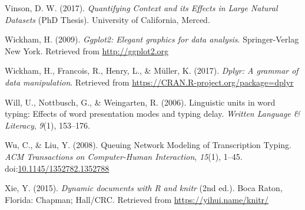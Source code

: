 \documentclass[floatsintext,man]{apa6}
\theoremstyle{definition}
\theoremstyle{definition}
\theoremstyle{definition}
\theoremstyle{remark}
\begin{document}
\hypertarget{ref-vinson_quantifying_2017}{}
Vinson, D. W. (2017). \emph{Quantifying Context and its Effects in Large
Natural Datasets} (PhD Thesis). University of California, Merced.

\hypertarget{ref-R-ggplot2}{}
Wickham, H. (2009). \emph{Ggplot2: Elegant graphics for data analysis}.
Springer-Verlag New York. Retrieved from \url{http://ggplot2.org}

\hypertarget{ref-R-dplyr}{}
Wickham, H., Francois, R., Henry, L., \& Müller, K. (2017). \emph{Dplyr:
A grammar of data manipulation}. Retrieved from
\url{https://CRAN.R-project.org/package=dplyr}

\hypertarget{ref-will_linguistic_2006}{}
Will, U., Nottbusch, G., \& Weingarten, R. (2006). Linguistic units in
word typing: Effects of word presentation modes and typing delay.
\emph{Written Language \& Literacy}, \emph{9}(1), 153--176.

\hypertarget{ref-wu_queuing_2008}{}
Wu, C., \& Liu, Y. (2008). Queuing Network Modeling of Transcription
Typing. \emph{ACM Transactions on Computer-Human Interaction},
\emph{15}(1), 1--45.
doi:\href{https://doi.org/10.1145/1352782.1352788}{10.1145/1352782.1352788}

\hypertarget{ref-R-knitr}{}
Xie, Y. (2015). \emph{Dynamic documents with R and knitr} (2nd ed.).
Boca Raton, Florida: Chapman; Hall/CRC. Retrieved from
\url{https://yihui.name/knitr/}

\endgroup
\end{document}

